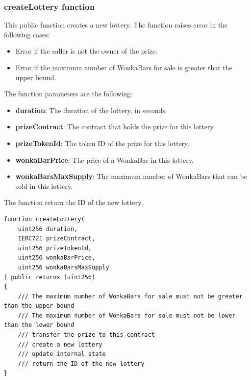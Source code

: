 \subsubsection{createLottery function}
This public function creates a new lottery. The function raises error in the following cases:
\begin{itemize}
    \item Error if the caller is not the owner of the prize.
    \item Error if the maximum number of WonkaBars for sale is greater that the upper bound.
\end{itemize}
The function parameters are the following:
\begin{itemize}
    \item \textbf{duration}: The duration of the lottery, in seconds.
    \item \textbf{prizeContract}: The contract that holds the prize for this lottery.
    \item \textbf{prizeTokenId}: The token ID of the prize for this lottery.
    \item \textbf{wonkaBarPrice}: The price of a WonkaBar in this lottery.
    \item \textbf{wonkaBarsMaxSupply}: The maximum number of WonkaBars that can be sold in this lottery.
\end{itemize}
The function return the ID of the new lottery.
\begin{verbatim}
function createLottery(
    uint256 duration,
    IERC721 prizeContract,
    uint256 prizeTokenId,
    uint256 wonkaBarPrice,
    uint256 wonkaBarsMaxSupply
) public returns (uint256) 
{
    /// The maximum number of WonkaBars for sale must not be greater than the upper bound
    /// The maximum number of WonkaBars for sale must not be lower than the lower bound
    /// transfer the prize to this contract
    /// create a new lottery
    /// update internal state
    /// return the ID of the new lottery
}
\end{verbatim}

